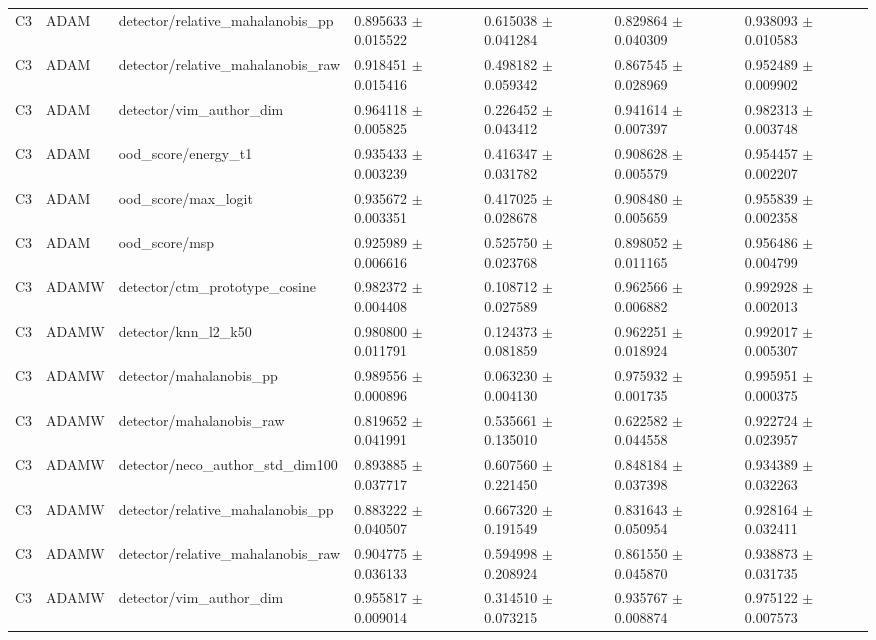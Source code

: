 \begin{longtable}{lllllll}
C3 & ADAM & detector/relative\_mahalanobis\_pp & 0.895633 $\pm$ 0.015522 & 0.615038 $\pm$ 0.041284 & 0.829864 $\pm$ 0.040309 & 0.938093 $\pm$ 0.010583 \\
C3 & ADAM & detector/relative\_mahalanobis\_raw & 0.918451 $\pm$ 0.015416 & 0.498182 $\pm$ 0.059342 & 0.867545 $\pm$ 0.028969 & 0.952489 $\pm$ 0.009902 \\
C3 & ADAM & detector/vim\_author\_dim & 0.964118 $\pm$ 0.005825 & 0.226452 $\pm$ 0.043412 & 0.941614 $\pm$ 0.007397 & 0.982313 $\pm$ 0.003748 \\
C3 & ADAM & ood\_score/energy\_t1 & 0.935433 $\pm$ 0.003239 & 0.416347 $\pm$ 0.031782 & 0.908628 $\pm$ 0.005579 & 0.954457 $\pm$ 0.002207 \\
C3 & ADAM & ood\_score/max\_logit & 0.935672 $\pm$ 0.003351 & 0.417025 $\pm$ 0.028678 & 0.908480 $\pm$ 0.005659 & 0.955839 $\pm$ 0.002358 \\
C3 & ADAM & ood\_score/msp & 0.925989 $\pm$ 0.006616 & 0.525750 $\pm$ 0.023768 & 0.898052 $\pm$ 0.011165 & 0.956486 $\pm$ 0.004799 \\
C3 & ADAMW & detector/ctm\_prototype\_cosine & 0.982372 $\pm$ 0.004408 & 0.108712 $\pm$ 0.027589 & 0.962566 $\pm$ 0.006882 & 0.992928 $\pm$ 0.002013 \\
C3 & ADAMW & detector/knn\_l2\_k50 & 0.980800 $\pm$ 0.011791 & 0.124373 $\pm$ 0.081859 & 0.962251 $\pm$ 0.018924 & 0.992017 $\pm$ 0.005307 \\
C3 & ADAMW & detector/mahalanobis\_pp & 0.989556 $\pm$ 0.000896 & 0.063230 $\pm$ 0.004130 & 0.975932 $\pm$ 0.001735 & 0.995951 $\pm$ 0.000375 \\
C3 & ADAMW & detector/mahalanobis\_raw & 0.819652 $\pm$ 0.041991 & 0.535661 $\pm$ 0.135010 & 0.622582 $\pm$ 0.044558 & 0.922724 $\pm$ 0.023957 \\
C3 & ADAMW & detector/neco\_author\_std\_dim100 & 0.893885 $\pm$ 0.037717 & 0.607560 $\pm$ 0.221450 & 0.848184 $\pm$ 0.037398 & 0.934389 $\pm$ 0.032263 \\
C3 & ADAMW & detector/relative\_mahalanobis\_pp & 0.883222 $\pm$ 0.040507 & 0.667320 $\pm$ 0.191549 & 0.831643 $\pm$ 0.050954 & 0.928164 $\pm$ 0.032411 \\
C3 & ADAMW & detector/relative\_mahalanobis\_raw & 0.904775 $\pm$ 0.036133 & 0.594998 $\pm$ 0.208924 & 0.861550 $\pm$ 0.045870 & 0.938873 $\pm$ 0.031735 \\
C3 & ADAMW & detector/vim\_author\_dim & 0.955817 $\pm$ 0.009014 & 0.314510 $\pm$ 0.073215 & 0.935767 $\pm$ 0.008874 & 0.975122 $\pm$ 0.007573 \\

\end{longtable}
